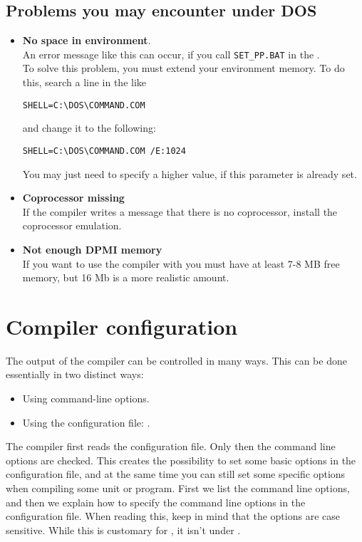 \documentclass{report}
\begin{document}
\section{Problems you may encounter under DOS}
\begin{itemize}
\item \textbf{No space in environment}.\\
An error message like this can occur, if you call
\verb|SET_PP.BAT| in the .\\
To solve this problem, you must extend your environment memory.
To do this, search a line in the  like
\begin{verbatim}
SHELL=C:\DOS\COMMAND.COM
\end{verbatim}
and change it to the following:
\begin{verbatim}
SHELL=C:\DOS\COMMAND.COM /E:1024
\end{verbatim}
You may just need to specify a higher value, if this parameter is already set.
\item \textbf{ Coprocessor missing}\\
If the compiler writes
a message that there is no coprocessor, install
the coprocessor emulation.
\item \textbf{Not enough DPMI memory}\\
If you want to use the compiler with  you must have at least
7-8 MB free  memory, but 16 Mb is a more realistic amount.
\end{itemize}



\chapter{Compiler configuration}
\label{ch:CompilerConfiguration}

The output of the compiler can be controlled in many ways. This can be done
essentially in two distinct ways:
\begin{itemize}
\item Using command-line options.
\item Using the configuration file: .
\end{itemize}
The compiler first reads the configuration file. Only then the command line
options are checked. This creates the possibility to set some basic options
in the configuration file, and at the same time you can still set some
specific options when compiling some unit or program. First we list the
command line options, and then we explain how to specify the command
line options in the configuration file. When reading this, keep in mind
that the options are case sensitive. While this is customary for \linux, it
isn't under \dos.
\end{document}
